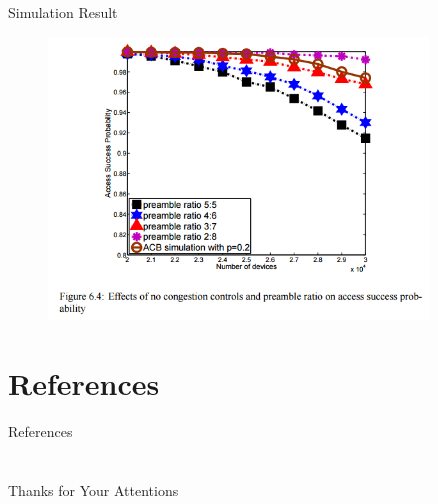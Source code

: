 \documentclass{beamer}
\begin{document}
\begin{frame}{Simulation Result}
    \begin{figure}[t]
        \centering
        \includegraphics[width=0.9\textwidth]{figures/6_4.png}
    \end{figure}
\end{frame}
\section{References}
\calcreferencespagetotal %
\begin{frame}[allowframebreaks]{References}
    \fontsize{9pt}{13}\selectfont
    
    
\end{frame}

\section{}

\begin{frame}
    \centering
    \Large{Thanks for Your Attentions}
\end{frame}
\end{document}
